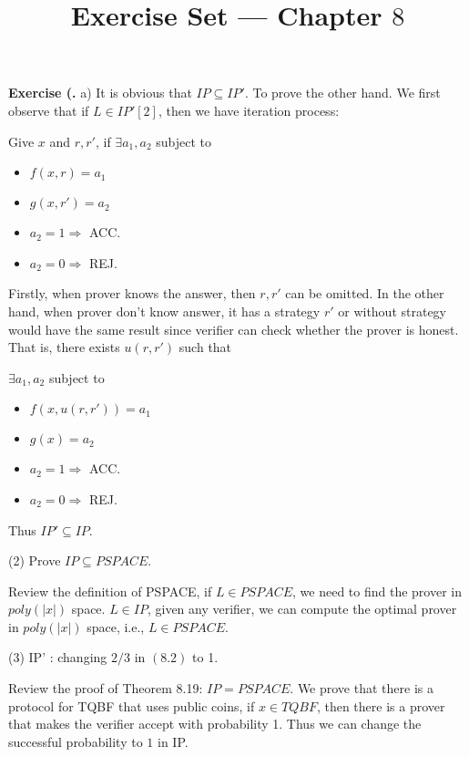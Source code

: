 \documentclass[a4paper]{article}
\title{Exercise Set --- Chapter $8$}
\date{}
\newenvironment{exercise}[1]{
	\par
	\noindent\textbf{Exercise #1.}\quad
}{
	\par
	\bigskip
}
\begin{document}
\maketitle

\begin{exercise}{8.1}
(a) It is obvious that $IP\subseteq IP'$. To prove the other hand. We first observe that if $L \in IP'[2]$, then we have iteration process:

Give $x$ and $r,r'$, if $\exists a_{1}, a_{2}$ subject to
\begin{itemize}
\item $f(x, r) = a_{1}$
\item $g(x, r') = a_{2}$
\item $a_{2} = 1\Rightarrow $ ACC.
\item $a_{2} = 0 \Rightarrow $ REJ.
\end{itemize}

Firstly, when prover knows the answer, then $r, r'$ can be omitted. In the other hand, when prover don't know answer, it has a strategy $r'$ or without strategy would have the same result since verifier can check whether the prover is honest. That is, there exists $u(r, r')$ such that

$\exists a_{1}, a_{2}$ subject to
\begin{itemize}
\item $f(x, u(r,r')) = a_{1}$
\item $g(x) = a_{2}$
\item $a_{2} = 1\Rightarrow $ ACC.
\item $a_{2} = 0 \Rightarrow $ REJ.
\end{itemize}
  Thus $IP'\subseteq IP$.

(2) Prove $IP\subseteq PSPACE$.

Review the definition of PSPACE, if $L\in PSPACE$, we need to find the prover in $poly(|x|)$ space. $L\in IP$, given any verifier, we can compute the optimal prover in $poly(|x|)$ space, i.e., $L\in PSPACE$.

(3) IP' : changing $2/3$ in $(8.2)$ to 1.

Review the proof of Theorem 8.19: $IP = PSPACE$. We prove that there is a protocol for TQBF that uses public coins, if $x\in TQBF$, then there is a prover that makes the verifier accept with probability 1. Thus we can change the successful probability to $1$ in IP.


\end{exercise}
\end{document}
